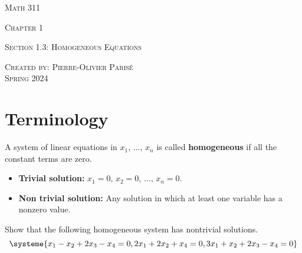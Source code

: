 \documentclass[20pt,a4paper]{extarticle}
\newcounter{example}[section]
\newcounter{definition}[section]
\begin{document}
\thispagestyle{empty}

\begin{center}
\vspace*{2.5cm}

{\Huge \textsc{Math 311}}

\vspace*{2cm}

{\LARGE \textsc{Chapter 1}} 

\vspace*{0.75cm}

\noindent\textsc{Section 1.3: Homogeneous Equations}

\vspace*{0.75cm}

\tableofcontents

\vfill

\noindent \textsc{Created by: Pierre-Olivier Paris{\'e}} \\
\textsc{Spring 2024}
\end{center}

\newpage

\section{Terminology}

\begin{definition}
A system of linear equations in $x_1$, $\ldots$, $x_n$ is called \textbf{homogeneous} if all the constant terms are zero.
	\begin{itemize}
		\item \textbf{Trivial solution:} $x_1 = 0$, $x_2 = 0$, $\ldots$, $x_n = 0$.
		\item \textbf{Non trivial solution:} Any solution in which at least one variable has a nonzero value.
	\end{itemize}
\end{definition}



\begin{example}\label{Example:HomogeneousSystemSolution}
Show that the following homogeneous system has nontrivial solutions.
	\[
		\systeme{x_1 - x_2 + 2x_3 - x_4 = 0, 2x_1 + 2x_2 + x_4 = 0, 3x_1 + x_2 + 2x_3 - x_4 = 0}
	\]
\end{example}

\begin{solution}

\end{solution}

\vfill
\end{document}
